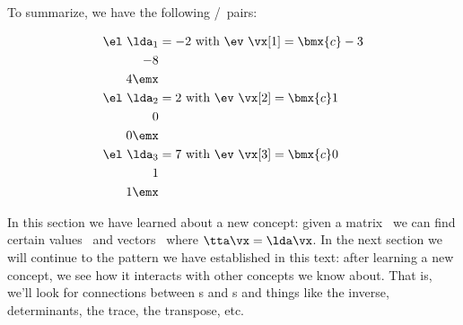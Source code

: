 {To summarize, we have the following \el/\ev\ pairs: 

\begin{align*}
\text{\el\ } \lda_1 & = -2 \text{ with \ev\ } \vx[1] = \bmx{c}-3\\-8\\4\emx\\
\text{\el\ } \lda_2 & = 2 \text{ with \ev\ } \vx[2] = \bmx{c}1\\0\\0\emx\\
\text{\el\ } \lda_3 & = 7 \text{ with \ev\ } \vx[3] = \bmx{c}0\\1\\1\emx
\end{align*}
}


In this section we have learned about a new concept: given a matrix \tta\ we can find certain values \lda\ and vectors \vx\ where $\tta\vx =\lda\vx$. In the next section we will continue to the pattern we have established in this text: after learning a new concept, we see how it interacts with other concepts we know about. That is, we'll look for connections between \el s and \ev s and things like the inverse, determinants, the trace, the transpose, etc.

